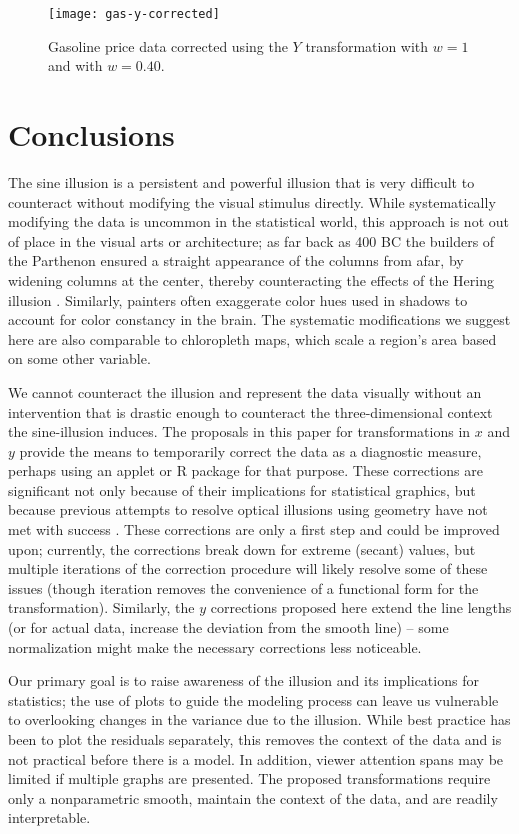 \documentclass[11pt]{isuthesis}\usepackage[]{graphicx}\usepackage[]{color}
\begin{document}
\begin{figure}[h]
\centering
\texttt{[image: gas-y-corrected]}
\caption[Gasoline price data, Y transformation]{Gasoline price data corrected using the $Y$ transformation with $w=1$ and with $w=0.40$. }
\label{fig:gasprices-y-correct}
\end{figure}

\section{Conclusions}
The sine illusion is a persistent and powerful illusion that is very difficult to counteract without modifying the visual stimulus directly. While systematically modifying the data is uncommon in the statistical world, this approach is not out of place in the visual arts or architecture; as far back as 400 BC the builders of the Parthenon ensured a straight appearance of the columns from afar, by widening columns at the center, thereby counteracting the effects of the Hering illusion \citep{naturalscenes,hering}. Similarly, painters often exaggerate color hues used in shadows to account for color constancy in the brain. The systematic modifications we suggest here are also comparable to chloropleth maps, which scale a region's area based on some other variable. 

We cannot counteract the illusion and represent the data visually without an intervention that is drastic enough to counteract the three-dimensional context the sine-illusion induces. The proposals in this paper for transformations in $x$ and $y$ provide the means to temporarily correct the data as a diagnostic measure, perhaps using an applet or R package for that purpose. These corrections are significant not only because of their implications for statistical graphics, but because previous attempts to resolve optical illusions using geometry have not met with success \citep{westheimer2008illusions}. These corrections are only a first step and could be improved upon; currently, the corrections break down for extreme (secant) values, but multiple iterations of the correction procedure will likely resolve some of these issues (though iteration removes the convenience of a functional form for the transformation). Similarly, the $y$ corrections proposed here extend the line lengths (or for actual data, increase the deviation from the smooth line) -- some normalization might make the necessary corrections less noticeable. 

Our primary goal is to raise awareness of the illusion and its implications for statistics; the use of plots to guide the modeling process can leave us vulnerable to overlooking changes in the variance due to the illusion. While best practice has  been to plot the residuals separately, this removes the context of the data and is not practical before there is a model. In addition, viewer attention spans may be limited if multiple graphs are presented. The proposed transformations require only a nonparametric smooth, maintain the context of the data, and are readily interpretable. 
\end{document}
